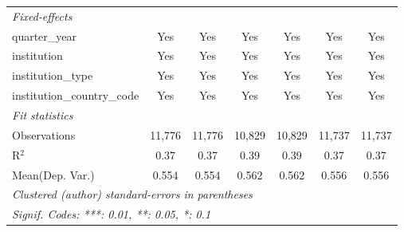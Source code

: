 \begin{tabular}{lcccccc}
   \midrule
   \emph{Fixed-effects}\\
   quarter\_year                      & Yes     & Yes           & Yes     & Yes     & Yes     & Yes\\  
   institution                        & Yes     & Yes           & Yes     & Yes     & Yes     & Yes\\  
   institution\_type                  & Yes     & Yes           & Yes     & Yes     & Yes     & Yes\\  
   institution\_country\_code         & Yes     & Yes           & Yes     & Yes     & Yes     & Yes\\  
   \midrule
   \emph{Fit statistics}\\
   Observations                       & 11,776  & 11,776        & 10,829  & 10,829  & 11,737  & 11,737\\  
   R$^2$                              & 0.37    & 0.37          & 0.39    & 0.39    & 0.37    & 0.37\\  
Mean(Dep. Var.) & 0.554 & 0.554 & 0.562 & 0.562 & 0.556 & 0.556 \\
   \midrule \midrule
   \multicolumn{7}{l}{\emph{Clustered (author) standard-errors in parentheses}}\\
   \multicolumn{7}{l}{\emph{Signif. Codes: ***: 0.01, **: 0.05, *: 0.1}}\\
\end{tabular}
\par\endgroup
